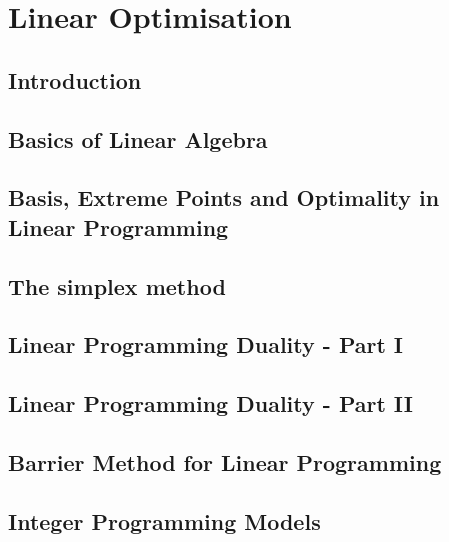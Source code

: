 \documentclass{bookest}
\begin{document}
	

	\tableofcontents
	
	\part{Linear Optimisation}
	
	\chapter{Introduction} \label{chapter_1}
	
	
	\chapter{Basics of Linear Algebra} \label{chapter_2}
	
	
	\chapter{Basis, Extreme Points and Optimality in Linear Programming} \label{chapter_3}
		 
	
	\chapter{The simplex method} \label{chapter_4}
		
		
	\chapter{Linear Programming Duality - Part I} \label{chapter_5}
		
	
	\chapter{Linear Programming Duality - Part II} \label{chapter_6}
	
	
	\chapter{Barrier Method for Linear Programming} \label{chapter_7}
	
	
	\chapter{Integer Programming Models} \label{chapter_8}
	
	
\end{document}
